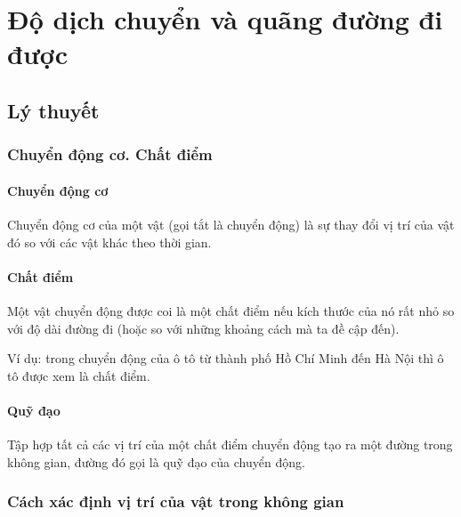 \let\lesson\undefined
\newcommand{\lesson}{\phantomlesson{Bài 4: Chuyển động thẳng}}
\chapter[Độ dịch chuyển và quãng đường]{Độ dịch chuyển và quãng đường đi được}
\setcounter{section}{0}
\section{Lý thuyết}
\subsection{Chuyển động cơ. Chất điểm}
\subsubsection{Chuyển động cơ}
Chuyển động cơ của một vật (gọi tắt là chuyển động) là sự thay đổi vị trí của vật đó so với các vật khác theo thời gian.
\subsubsection{Chất điểm}
Một vật chuyển động được coi là một chất điểm nếu kích thước của nó rất nhỏ so với độ dài đường đi (hoặc so với những khoảng cách mà ta đề cập đến).

Ví dụ: trong chuyển động của ô tô từ thành phố Hồ Chí Minh đến Hà Nội thì ô tô được xem là chất điểm.
\subsubsection{Quỹ đạo}
Tập hợp tất cả các vị trí của một chất điểm chuyển động tạo ra một đường trong không gian, đường đó gọi là quỹ đạo của chuyển động.
\subsection{Cách xác định vị trí của vật trong không gian}
